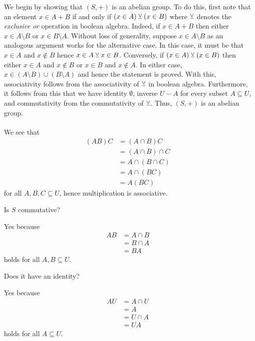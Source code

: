 \begin{enumerate}[(a)]
\begin{solution}
		We begin by showing that $(S, +)$ is an abelian group. To do this, first note that an element $x \in A + B$ if and only if $(x \in A) \veebar (x \in B)$ where $\veebar$ denotes the \textit{exclusive or} operation in boolean algebra. Indeed, if $x \in A + B$ then either $x \in A \setminus B$ or $x \in B \setminus A$. Without loss of generality, suppose $x \in A \setminus B$ as an analogous argument works for the alternative case. In this case, it must be that $x \in A$ and $x \notin B$ hence $x \in A \veebar x \in B$. Conversely, if $(x \in A) \veebar (x \in B)$ then either $x \in A$ and $x \notin B$ or $x \in B$ and $x \notin A$. In either case, $x \in (A \setminus B) \cup (B \setminus A)$ and hence the statement is proved. With this, associativity follows from the associativity of $\veebar$ in boolean algebra. Furthermore, it follows from this that we have identity $\emptyset$, inverse $U - A$ for every subset $A \subseteq U$, and commutativity from the commutativity of $\veebar$. Thus, $(S, +)$ is an abelian group.\\
		\\
		We see that 
		\begin{align*}
			(AB)C &= (A \cap B)C\\
			&= (A \cap B)\cap C\\
			&= A \cap (B \cap C)\\
			&= A \cap (BC)\\
			&= A(BC)
		\end{align*}
		for all $A, B, C \subseteq U$, hence multiplication is associative. 
	\end{solution}
	\begin{lightgraybox}
		Is $S$ commutative?
	\end{lightgraybox}
	\begin{solution}
		Yes because
		\begin{align*}
			AB &= A \cap B\\
			&= B \cap A\\
			&= BA
		\end{align*}
		holds for all $A, B \subseteq U$.
	\end{solution}
	\begin{lightgraybox}
		Does it have an identity?
	\end{lightgraybox}
	\begin{solution}
		Yes because
		\begin{align*}
			AU &= A \cap U\\
			&= A\\
			&= U\cap A\\
			&= UA
		\end{align*}
		holds for all $A \subseteq U$.
	\end{solution}
\end{enumerate}



